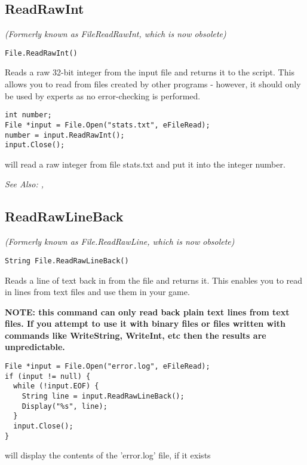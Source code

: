 \subsection{ReadRawInt}\label{File.ReadRawInt}%

\it{(Formerly known as FileReadRawInt, which is now obsolete)}

\begin{verbatim}
File.ReadRawInt()
\end{verbatim}
Reads a raw 32-bit integer from the input file and returns it to the script.
This allows you to read from files created by other programs - however, it
should only be used by experts as no error-checking is performed.

\begin{verbatim}
int number;
File *input = File.Open("stats.txt", eFileRead);
number = input.ReadRawInt();
input.Close();
\end{verbatim}
will read a raw integer from file stats.txt and put it into the integer number.

\it{See Also:} , 


\subsection{ReadRawLineBack}\label{File.ReadRawLineBack}%

\it{(Formerly known as File.ReadRawLine, which is now obsolete)}

\begin{verbatim}
String File.ReadRawLineBack()
\end{verbatim}
Reads a line of text back in from the file and returns it. This enables you to
read in lines from text files and use them in your game.

\bf{NOTE:} this command can only read back plain text lines from text files. If you
attempt to use it with binary files or files written with commands like WriteString,
WriteInt, etc then the results are unpredictable.

\begin{verbatim}
File *input = File.Open("error.log", eFileRead);
if (input != null) {
  while (!input.EOF) {
    String line = input.ReadRawLineBack();
    Display("%s", line);
  }
  input.Close();
}
\end{verbatim}
will display the contents of the 'error.log' file, if it exists


